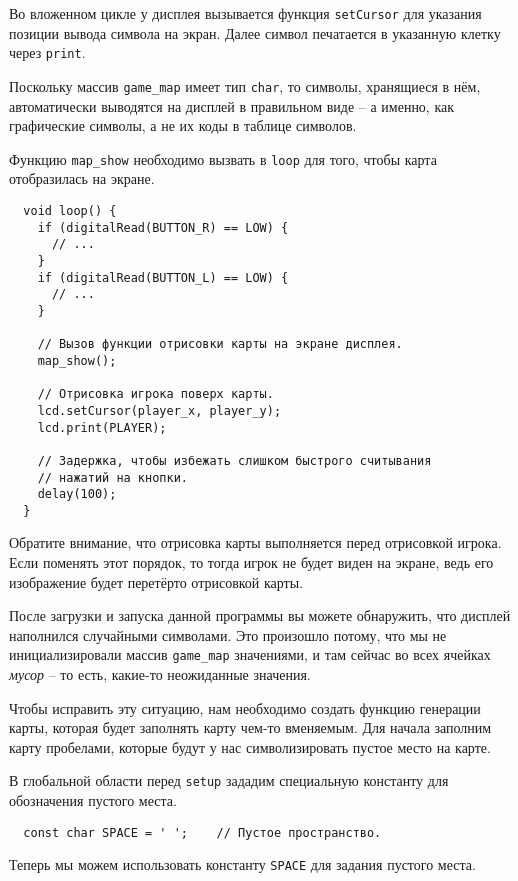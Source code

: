 \documentclass[../sparc.tex]{subfiles}
\begin{document}
Во вложенном цикле у дисплея вызывается функция \texttt{setCursor} для указания
позиции вывода символа на экран.  Далее символ печатается в указанную клетку
через \texttt{print}.

Поскольку массив \texttt{game\_map} имеет тип \texttt{char}, то символы,
хранящиеся в нём, автоматически выводятся на дисплей в правильном виде -- а
именно, как графические символы, а не их коды в таблице символов.

Функцию \texttt{map\_show} необходимо вызвать в \texttt{loop} для того, чтобы
карта отобразилась на экране.

\begin{verbatim}
  void loop() {
    if (digitalRead(BUTTON_R) == LOW) {
      // ...
    }
    if (digitalRead(BUTTON_L) == LOW) {
      // ...
    }

    // Вызов функции отрисовки карты на экране дисплея.
    map_show();

    // Отрисовка игрока поверх карты.
    lcd.setCursor(player_x, player_y);
    lcd.print(PLAYER);

    // Задержка, чтобы избежать слишком быстрого считывания
    // нажатий на кнопки.
    delay(100);
  }
\end{verbatim}

Обратите внимание, что отрисовка карты выполняется перед отрисовкой игрока.
Если поменять этот порядок, то тогда игрок не будет виден на экране, ведь его
изображение будет перетёрто отрисовкой карты.

После загрузки и запуска данной программы вы можете обнаружить, что дисплей
наполнился случайными символами.  Это произошло потому, что мы не
инициализировали массив \texttt{game\_map} значениями, и там сейчас во всех
ячейках \emph{мусор} -- то есть, какие-то неожиданные значения.

Чтобы исправить эту ситуацию, нам необходимо создать функцию генерации карты,
которая будет заполнять карту чем-то вменяемым.  Для начала заполним карту
пробелами, которые будут у нас символизировать пустое место на карте.

В глобальной области перед \texttt{setup} зададим специальную константу для
обозначения пустого места.

\begin{verbatim}
  const char SPACE = ' ';    // Пустое пространство.
\end{verbatim}

Теперь мы можем использовать константу \texttt{SPACE} для задания пустого места.
\end{document}
